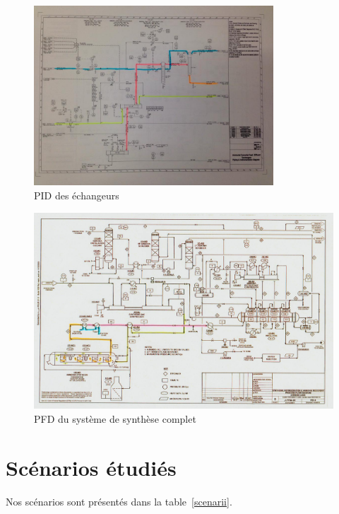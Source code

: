 \begin{figure}
\centering
\includegraphics[width=0.8\textwidth]{img/hazop2}
\caption{PID des échangeurs}
\label{ann3}
\end{figure}

\begin{figure}
\includegraphics[width=\textwidth]{img/hazop3}
\caption{PFD du système de synthèse complet}
\label{ann4}
\end{figure}

\section{Scénarios étudiés}
Nos scénarios sont présentés dans la table~\ref{scenarii}.


